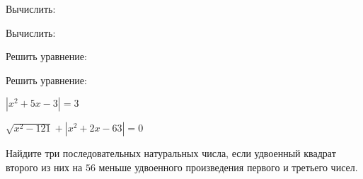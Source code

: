 \begin{listofex}
	\item Вычислить:
	\begin{enumcols}[itemcolumns=1]
		\item {}
		\item {}
		\item {}
		\item {}
		\item {}
	\end{enumcols}
	\item Вычислить:
	\begin{enumcols}[itemcolumns=2]
		\item {}
		\item {}
		\item {}
		\item {}
	\end{enumcols}
	\item Решить уравнение:
	\begin{enumcols}[itemcolumns=2]
		\item {}
		\item {}
		\item {}
		\item {}
		\item {}
	\end{enumcols}
	\item Решить уравнение:
	\begin{enumcols}[itemcolumns=2]
		\item \( |x^2+5x-3|=3 \)
		\item \( \sqrt{x^2-121}+|x^2+2x-63|=0 \)
	\end{enumcols}
	\item Найдите три последовательных натуральных числа, если удвоенный квадрат второго из
	них на \( 56 \) меньше удвоенного произведения первого и третьего чисел.
\end{listofex}